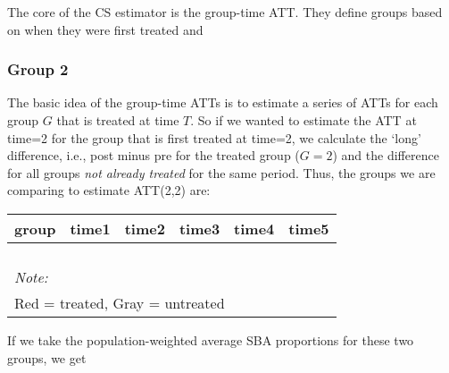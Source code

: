 \documentclass[
]{article}
\begin{document}
The core of the CS estimator is the group-time ATT. They define groups
based on when they were first treated and

\hypertarget{group-2}{%
\subsubsection{Group 2}\label{group-2}}

The basic idea of the group-time ATTs is to estimate a series of ATTs
for each group \(G\) that is treated at time \(T\). So if we wanted to
estimate the ATT at time=2 for the group that is first treated at
time=2, we calculate the `long' difference, i.e., post minus pre for the
treated group (\(G=2\)) and the difference for all groups \emph{not
already treated} for the same period. Thus, the groups we are comparing
to estimate ATT(2,2) are:

\begin{table}
\centering
\begin{tabular}[t]{>{}r|>{}r|>{}r|>{}r|>{}r|>{}r}
\hline
group & time1 & time2 & time3 & time4 & time5\\
\hline
\cellcolor{white}{2} & \cellcolor{red}{\textcolor{black}{0.631}} & \cellcolor{red}{\textcolor{black}{0.711}} & \cellcolor{white}{0.814} & \cellcolor{white}{0.846} & \cellcolor{white}{0.826}\\
\hline
\cellcolor{white}{3} & \cellcolor{lightgray}{\textcolor{black}{0.678}} & \cellcolor{lightgray}{\textcolor{black}{0.770}} & \cellcolor{white}{0.664} & \cellcolor{white}{0.800} & \cellcolor{white}{0.784}\\
\hline
\cellcolor{white}{4} & \cellcolor{lightgray}{\textcolor{black}{0.778}} & \cellcolor{lightgray}{\textcolor{black}{0.807}} & \cellcolor{white}{0.673} & \cellcolor{white}{0.750} & \cellcolor{white}{0.868}\\
\hline
\cellcolor{white}{5} & \cellcolor{lightgray}{\textcolor{black}{0.854}} & \cellcolor{lightgray}{\textcolor{black}{0.939}} & \cellcolor{white}{0.854} & \cellcolor{white}{0.800} & \cellcolor{white}{0.855}\\
\hline
\multicolumn{6}{l}{\rule{0pt}{1em}\textit{Note: }}\\
\multicolumn{6}{l}{\rule{0pt}{1em}Red = treated, Gray = untreated}\\
\end{tabular}
\end{table}

If we take the population-weighted average SBA proportions for these two
groups, we get
\end{document}
